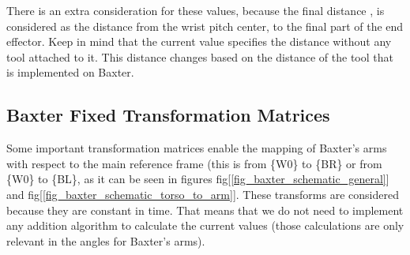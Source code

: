 \documentclass[11pt]{report} %
\begin{document}
\begin{table}[H]
\begin{center}
\caption{\label{tab:lengths_of_baxter} Lengths of Baxter robot. Adapted from \citep{cite_baxter_humanoid_robot_kinematics_ohio}.}
\end{center}
\end{table}

There is an extra consideration for these values, because the final distance , is considered as the distance from the wrist pitch center, to the final part of the end effector. Keep in mind that the current value specifies the distance without any tool attached to it. This distance changes based on the distance of the tool that is implemented on Baxter.\\


\subsection{Baxter Fixed Transformation Matrices}

Some important transformation matrices enable the mapping of Baxter's arms with respect to the main reference frame (this is from \{W0\} to \{BR\} or from \{W0\} to \{BL\}, as it can be seen in figures fig[\ref{fig_baxter_schematic_general}] and fig[\ref{fig_baxter_schematic_torso_to_arm}]. These transforms are considered  because they are constant in time. That means that we do not need to implement any addition algorithm to calculate the current values (those calculations are only relevant in the angles for Baxter's arms).\\
\end{document}
